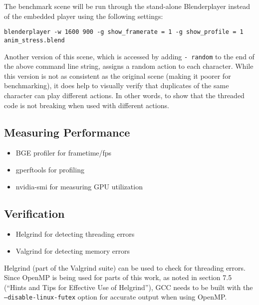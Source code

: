 The benchmark scene will be run through the stand-alone Blenderplayer instead of the embedded player using the following settings:
\begin{verbatim}
blenderplayer -w 1600 900 -g show_framerate = 1 -g show_profile = 1 anim_stress.blend
\end{verbatim}

Another version of this scene, which is accessed by adding \texttt{- random} to the end of the above command line string, assigns a random action to each character.
While this version is not as consistent as the original scene (making it poorer for benchmarking), it does help to visually verify that duplicates of the same character can play different actions.
In other words, to show that the threaded code is not breaking when used with different actions.

\subsection{Measuring Performance}
\ifsummaries
\begin{itemize}
 \item BGE profiler for frametime/fps
 \item gperftools for profiling
 \item nvidia-smi for measuring GPU utilization
\end{itemize}
\fi


\subsection{Verification}
\ifsummaries
\begin{itemize}
 \item Helgrind for detecting threading errors
 \item Valgrind for detecting memory errors
\end{itemize}
\fi

Helgrind (part of the Valgrind suite\cite{valgrind}) can be used to check for threading errors.
Since OpenMP is being used for parts of this work, as noted in section 7.5 (``Hints and Tips for Effective Use of Helgrind'')\cite{hgmanual}, GCC needs to be built with the \texttt{--disable-linux-futex} option for accurate output when using OpenMP.

